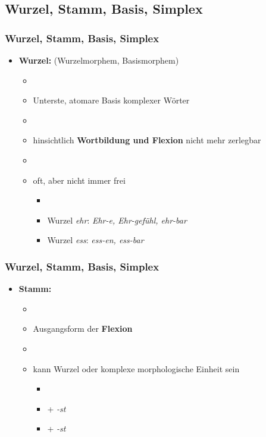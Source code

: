 \subsection{Wurzel, Stamm, Basis, Simplex}


\begin{frame}
\frametitle{Wurzel, Stamm, Basis, Simplex}

\begin{itemize}
	\item \textbf{Wurzel:} (Wurzelmorphem, Basismorphem)
	
	\begin{itemize}
		\item[]
		\item Unterste, atomare Basis komplexer Wörter
		\item[]
		\item hinsichtlich \textbf{Wortbildung und Flexion} nicht mehr zerlegbar
		\item[]
		\item oft, aber nicht immer frei
		
		\begin{itemize}
			\item[]			
			\item Wurzel \emph{ehr}: \emph{Ehr-e, Ehr-gefühl, ehr-bar}
			\item Wurzel \emph{ess}: \emph{ess-en, ess-bar}
		\end{itemize}
	\end{itemize}
\end{itemize}


\end{frame}



\begin{frame}
\frametitle{Wurzel, Stamm, Basis, Simplex}

\begin{itemize}
	\item \textbf{Stamm:}
	
	\begin{itemize}
		\item[]
		\item Ausgangsform der \textbf{Flexion}
		\item[]
		\item kann Wurzel oder komplexe morphologische Einheit sein
		
		\begin{itemize}
			\item[]
			\item {} + \emph{-st}
			\item {} + \emph{-st}
		\end{itemize}
	\end{itemize}
\end{itemize}

\end{frame}



